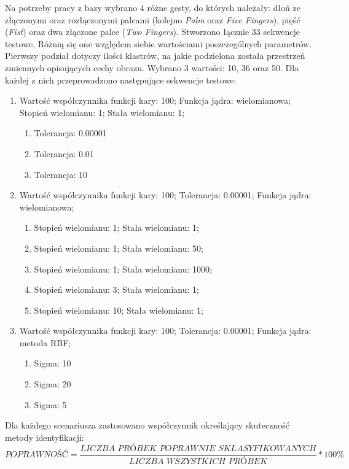 Na potrzeby pracy z bazy wybrano 4 różne gesty, do których należały: dłoń ze złączonymi oraz rozłączonymi palcami (kolejno \textit{Palm} oraz \textit{Five Fingers}), pięść (\textit{Fist}) oraz dwa złączone palce (\textit{Two Fingers}).
Stworzono łącznie 33 sekwencje testowe. Różnią się one względem siebie wartościami poszczególnych parametrów. Pierwszy podział dotyczy ilości klastrów, na jakie podzielona została przestrzeń zmiennych opisujących cechy obrazu. Wybrano 3 wartości: 10, 36 oraz 50. Dla każdej z nich przeprowadzono następujące sekwencje testowe: 
\begin{enumerate}
	\item Wartość współczynnika funkcji kary: 100; Funkcja jądra: wielomianowa; Stopień wielomianu: 1; Stała wielomianu: 1; 
	\begin{enumerate}
		\item \label{tol1} Tolerancja: 0.00001
		\item \label{tol2} Tolerancja: 0.01
		\item \label{tol3} Tolerancja: 10
	\end{enumerate}
	\item Wartość współczynnika funkcji kary: 100; 
	Tolerancja: 0.00001; Funkcja jądra: wielomianowa;
	\begin{enumerate}
		\item \label{pol1} Stopień wielomianu: 1; Stała wielomianu: 1;
		\item \label{pol2}Stopień wielomianu: 1; Stała wielomianu: 50;
		\item \label{pol3} Stopień wielomianu: 1; Stała wielomianu: 1000;
		\item \label{pol4} Stopień wielomianu: 3; Stała wielomianu: 1;
		\item \label{pol5} Stopień wielomianu: 10; Stała wielomianu: 1;
	\end{enumerate}
	\item Wartość współczynnika funkcji kary: 100; 
	Tolerancja: 0.00001; Funkcja jądra: metoda RBF;
	\begin{enumerate}
		\item \label{sig1} Sigma: 10
		\item \label{sig2} Sigma: 20
		\item \label{sig3} Sigma: 5
	\end{enumerate}
\end{enumerate}

Dla każdego scenariusza zastosowano współczynnik określający skuteczność metody identyfikacji:
\begin{equation}
\textit{POPRAWNOŚĆ} = \frac{\textit{LICZBA PRÓBEK POPRAWNIE SKLASYFIKOWANYCH}}{\textit{LICZBA WSZYSTKICH PRÓBEK}} * \textit{100\%}
\end{equation}


